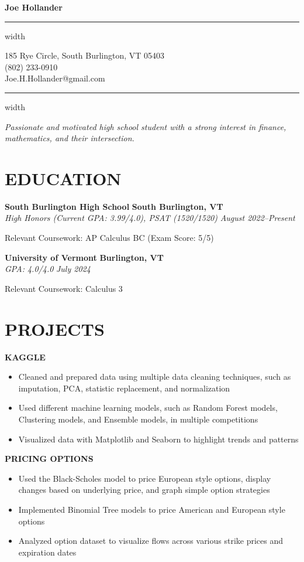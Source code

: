 \documentclass[11pt,letterpaper]{article}
\newcommand{\name}[1]{
  \begin{center}
    \Huge\textbf{#1}
  \end{center}
  \vspace{-0.5em}
  \hrule height 0.4pt width \textwidth
  \vspace{0.5em}
}
\newcommand{\contact}[3]{
  \begin{center}
    #1 \\
    #2 \\
    #3
  \end{center}
  \vspace{-0.5em}
  \hrule height 0.4pt width \textwidth
  \vspace{0.5em}
}
\newcommand{\role}[4]{
  \begin{center}
  \textbf{#1} \hfill \textbf{#2} \\
  \textit{#3} \hfill \textit{#4}
  \end{center}
}
\begin{document}
\name{Joe Hollander}
\vspace{-0.5em}
\contact{185 Rye Circle, South Burlington, VT 05403}{(802) 233-0910}{Joe.H.Hollander@gmail.com}

\vspace{-0.5em}
\begin{center}
\textit{Passionate and motivated high school student with a strong interest in finance, mathematics, and their intersection. }
\end{center}

\section{EDUCATION}

\vspace{0.5em}
\role{South Burlington High School}{South Burlington, VT}{High Honors (Current GPA: 3.99/4.0), PSAT (1520/1520)}{August 2022--Present}   
\begin{flushleft}
Relevant Coursework: AP Calculus BC (Exam Score: 5/5)
\end{flushleft}

\role{University of Vermont}{Burlington, VT}{GPA: 4.0/4.0}{July 2024}
\begin{flushleft}
  Relevant Coursework: Calculus 3
  \end{flushleft}


\section{PROJECTS}
\vspace{1em}

\begin{flushleft}
  \textbf{KAGGLE}
  \begin{itemize}[leftmargin=*,nosep]
    \item Cleaned and prepared data using multiple data cleaning techniques, such as imputation, PCA, statistic replacement, and normalization
    \item Used different machine learning models, such as Random Forest models, Clustering models, and Ensemble models, in multiple competitions
    \item Visualized data with Matplotlib and Seaborn to highlight trends and patterns
  \end{itemize}
\end{flushleft}


\begin{flushleft}
  \textbf{PRICING OPTIONS}
  \begin{itemize}[leftmargin=*,nosep] 
    \item Used the Black-Scholes model to price European style options, display changes based on underlying price, and graph simple option strategies
    \item Implemented Binomial Tree models to price American and European style options
    \item Analyzed option dataset to visualize flows across various strike prices and expiration dates
  \end{itemize}
\end{flushleft}
\end{document}
